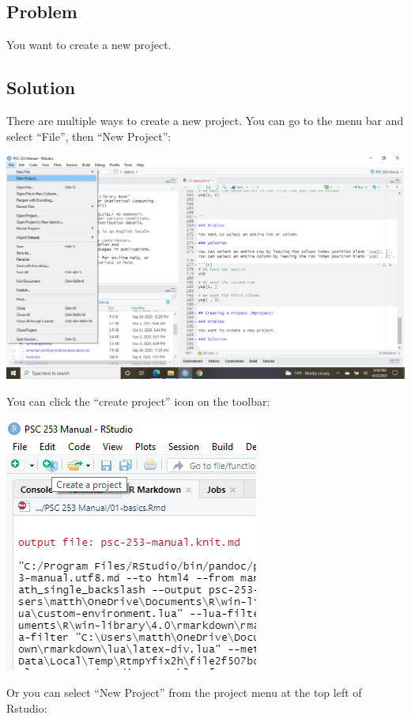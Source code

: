 \documentclass[
]{book}
\begin{document}
\hypertarget{problem-5}{%
\subsection{Problem}\label{problem-5}}

You want to create a new project.

\hypertarget{solution-5}{%
\subsection{Solution}\label{solution-5}}

There are multiple ways to create a new project. You can go to the menu bar and select ``File'', then ``New Project'':

\includegraphics{images/projectfile.png}

You can click the ``create project'' icon on the toolbar:

\includegraphics{images/projectbar.png}

Or you can select ``New Project'' from the project menu at the top left of Rstudio:
\end{document}
